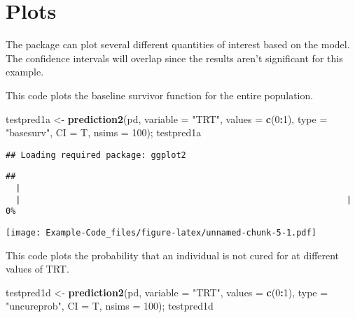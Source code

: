 \documentclass[]{article}
\newenvironment{Shaded}{\begin{snugshade}}{\end{snugshade}}
\newcommand{\DataTypeTok}[1]{\textcolor[rgb]{0.13,0.29,0.53}{#1}}
\newcommand{\DecValTok}[1]{\textcolor[rgb]{0.00,0.00,0.81}{#1}}
\newcommand{\KeywordTok}[1]{\textcolor[rgb]{0.13,0.29,0.53}{\textbf{#1}}}
\newcommand{\NormalTok}[1]{#1}
\newcommand{\OperatorTok}[1]{\textcolor[rgb]{0.81,0.36,0.00}{\textbf{#1}}}
\newcommand{\StringTok}[1]{\textcolor[rgb]{0.31,0.60,0.02}{#1}}
\begin{document}
\hypertarget{plots}{%
\section{Plots}\label{plots}}

The package can plot several different quantities of interest based on
the model. The confidence intervals will overlap since the results
aren't significant for this example.

This code plots the baseline survivor function for the entire
population.

\begin{Shaded}
\begin{Highlighting}[]
\NormalTok{testpred1a <-}\StringTok{ }\KeywordTok{prediction2}\NormalTok{(pd, }\DataTypeTok{variable =} \StringTok{"TRT"}\NormalTok{, }\DataTypeTok{values =} \KeywordTok{c}\NormalTok{(}\DecValTok{0}\OperatorTok{:}\DecValTok{1}\NormalTok{), }\DataTypeTok{type =} \StringTok{"basesurv"}\NormalTok{, }\DataTypeTok{CI =}\NormalTok{ T, }\DataTypeTok{nsims =} \DecValTok{100}\NormalTok{); testpred1a}
\end{Highlighting}
\end{Shaded}

\begin{verbatim}
## Loading required package: ggplot2
\end{verbatim}

\begin{verbatim}
## 
  |                                                                       
  |                                                                 |   0%
\end{verbatim}

\texttt{[image: Example-Code\_files/figure-latex/unnamed-chunk-5-1.pdf]}

This code plots the probability that an individual is not cured for at
different values of TRT.

\begin{Shaded}
\begin{Highlighting}[]
\NormalTok{testpred1d <-}\StringTok{ }\KeywordTok{prediction2}\NormalTok{(pd, }\DataTypeTok{variable =} \StringTok{"TRT"}\NormalTok{, }\DataTypeTok{values =} \KeywordTok{c}\NormalTok{(}\DecValTok{0}\OperatorTok{:}\DecValTok{1}\NormalTok{), }\DataTypeTok{type =} \StringTok{"uncureprob"}\NormalTok{, }\DataTypeTok{CI =}\NormalTok{ T, }\DataTypeTok{nsims =} \DecValTok{100}\NormalTok{); testpred1d}
\end{Highlighting}
\end{Shaded}
\end{document}
